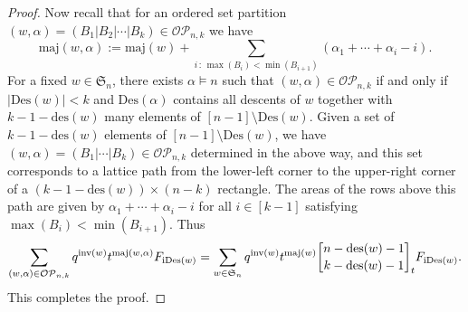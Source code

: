 \documentclass[ALCO,ThmDefs,published]{cedram}
\newcommand{\symm}{{\mathfrak{S}}}
\theoremstyle{plain}
\newcommand{\maj}{{\mathrm {maj}}}
\newcommand{\inv}{{\mathrm {inv}}}
\newcommand{\Des}{{\mathrm {Des}}}
\newcommand{\des}{{\mathrm {des}}}
\newcommand{\iDes}{{\mathrm {iDes}}}
\newcommand{\symm}{{\mathfrak{S}}}
\newcommand{\OP}{{\mathcal{OP}}}
\begin{document}
\begin{proof}
Now recall that for an ordered set partition $(w,\alpha) = (B_1|B_2|\cdots|B_k) \in \OP_{n,k}$ we have
\[ \maj(w, \alpha) := \maj(w) + \sum_{i \,  : \,  \max(B_i) < \min(B_{i+1})} (\alpha_1 + \cdots + \alpha_i - i).\]
For a fixed $w\in\symm_n$, there exists $\alpha\models n$ such that $(w,\alpha)\in\OP_{n,k}$ if and only if $|\Des(w)|<k$ and $\Des(\alpha)$ contains all descents of $w$ together with $k-1-\des(w)$ many elements of $[n-1]\setminus\Des(w)$.
Given a set of $k-1-\des(w)$  elements of $[n-1]\setminus\Des(w)$, we have $(w,\alpha) = (B_1|\cdots|B_k)\in\OP_{n,k}$ determined in the above way, and this set corresponds to a lattice path from the lower-left corner to the upper-right corner of a $(k-1-\des(w))\times(n-k)$ rectangle. 
The areas of the rows above this path are given by $\alpha_1+\cdots+\alpha_i - i$ for all $i\in[k-1]$ satisfying %
$\max(B_i)<\min(B_{i+1})$.
Thus
\[ \sum_{(w,\alpha) \in \OP_{n,k}} q^{\inv(w)} t^{\maj(w,\alpha)} F_{\iDes(w)} \\
= \sum_{w \in \symm_n} q^{\inv(w)} t^{\maj(w)} {n - \des(w) - 1 \brack k - \des(w) - 1}_t F_{\iDes(w)}.  \]
This completes the proof. 
\end{proof}
\end{document}

